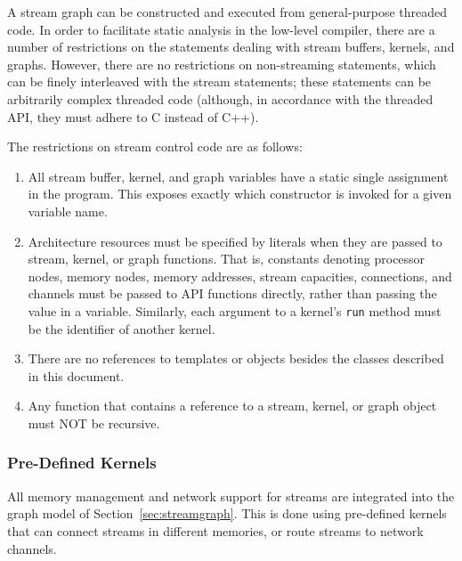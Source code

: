 
A stream graph can be constructed and executed from general-purpose
threaded code.  In order to facilitate static analysis in the
low-level compiler, there are a number of restrictions on the
statements dealing with stream buffers, kernels, and graphs.  However,
there are no restrictions on non-streaming statements, which can be
finely interleaved with the stream statements; these statements can be
arbitrarily complex threaded code (although, in accordance with the
threaded API, they must adhere to C instead of C++).

The restrictions on stream control code are as follows:

\begin{enumerate}

\item All stream buffer, kernel, and graph variables have a static
single assignment in the program.  This exposes exactly which
constructor is invoked for a given variable name.

\item Architecture resources must be specified by literals when they
are passed to stream, kernel, or graph functions.  That is, constants
denoting processor nodes, memory nodes, memory addresses, stream
capacities, connections, and channels must be passed to API functions
directly, rather than passing the value in a variable.  Similarly,
each argument to a kernel's {\tt run} method must be the identifier of
another kernel.

\item There are no references to templates or objects besides the
classes described in this document.

\item Any function that contains a reference to a stream, kernel, or
graph object must NOT be recursive.

\end{enumerate}

\subsubsection{Pre-Defined Kernels}
\label{sec:predef}

All memory management and network support for streams are integrated
into the graph model of Section~\ref{sec:streamgraph}.  This is done
using pre-defined kernels that can connect streams in different
memories, or route streams to network channels.

